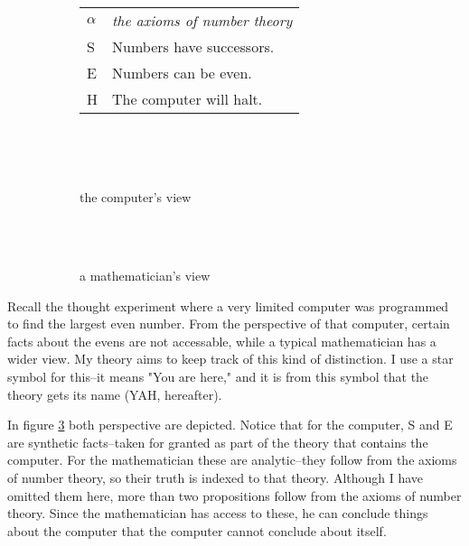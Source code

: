 \documentclass[12pt]{article}
\begin{document}
\begin{flushleft}
\begin{figure}[h]
    \centering
    \begin{subfigure}{\linewidth}
        \centering
        \begin{tabular}{l|l}
            \hline
            $\alpha$ & \textit{the axioms of number theory}\\
            S & Numbers have successors.\\
            E & Numbers can be even.\\
            H & The computer will halt.\\
            \hline
        \end{tabular}
    \end{subfigure}\\
    \par\bigskip
    \begin{subfigure}{.5\linewidth}
        \hspace*{7em}%
        \fitchprf
        {
             \\
        }
        {
            \pline{\bigstar}
        }
        \caption{the computer's view}
        \label{computer}
    \end{subfigure}%
    \begin{subfigure}{.5\linewidth}
        \centering
        \fitchctx
        {
            \pline{\bigstar}\\
            \subproof
            {
                \pline{\mathnormal{\alpha}}
            }
            {
                 \\
            }
        }
        \caption{a mathematician's view}
        \label{mathematician}
    \end{subfigure}
    \caption{}
    \label{even}
\end{figure}

Recall the thought experiment where a very limited computer was programmed to find the largest even number.
From the perspective of that computer, certain facts about the evens are not accessable, while a typical mathematician has a wider view.
My theory aims to keep track of this kind of distinction.
I use a star symbol for this--it means "You are here," and it is from this symbol that the theory gets its name (YAH, hereafter).

In figure \ref{even} both perspective are depicted.
Notice that for the computer, S and E are synthetic facts--taken for granted as part of the theory that contains the computer.
For the mathematician these are analytic--they follow from the axioms of number theory, so their truth is indexed to that theory.
Although I have omitted them here, more than two propositions follow from the axioms of number theory.
Since the mathematician has access to these, he can conclude things about the computer that the computer cannot conclude about itself.


\end{flushleft}
\end{document}
